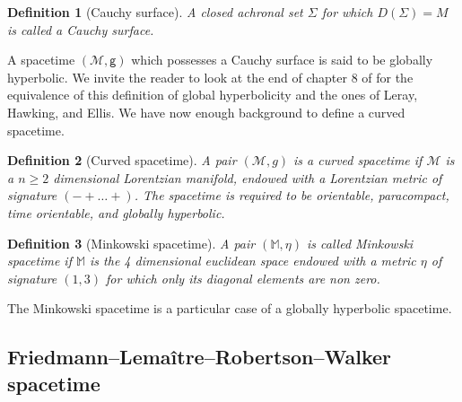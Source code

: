 \documentclass[11pt]{book}
\newcommand{\Mcal}{\mathcal{M}}
\newcommand{\Mbb}{\mathbb{M}}
\newcommand{\gsf}{\mathsf{g}}
\theoremstyle{break}
\newtheorem{definition}{Definition}[chapter]
\begin{document}
\bigskip


\begin{definition}[Cauchy surface]
A closed achronal set $\Sigma$ for which $D(\Sigma) = M$ is called a Cauchy surface. 
\end{definition}

A spacetime $(\Mcal,\gsf)$ which possesses a Cauchy surface is said to be globally hyperbolic. We invite the reader to look at the end of chapter $8$ of \cite{WALD_1984} for the equivalence of this definition of global hyperbolicity and the ones of Leray, Hawking, and Ellis. 
We have now enough background to define a curved spacetime.

\begin{definition}[Curved spacetime]\label{def:cst}
A pair $(\Mcal,g)$ is a curved spacetime if $\Mcal$ is a $n \geq 2$ dimensional Lorentzian manifold, endowed with a Lorentzian metric of signature $( - + \dots +)$. The spacetime is required to be orientable, paracompact, time orientable, and globally hyperbolic. 
\end{definition}


\begin{definition}[Minkowski spacetime]\label{def:minkowski}
A pair $(\Mbb,\eta)$ is called Minkowski spacetime if $\Mbb$ is the 4 dimensional euclidean space endowed with a metric $\eta$ of signature $(1,3)$ for which only its diagonal elements are non zero.
\end{definition}


The Minkowski spacetime is a particular case of a globally hyperbolic spacetime. 


\subsection{Friedmann--Lemaître--Robertson--Walker spacetime}
\label{p:FLRW}
\end{document}
